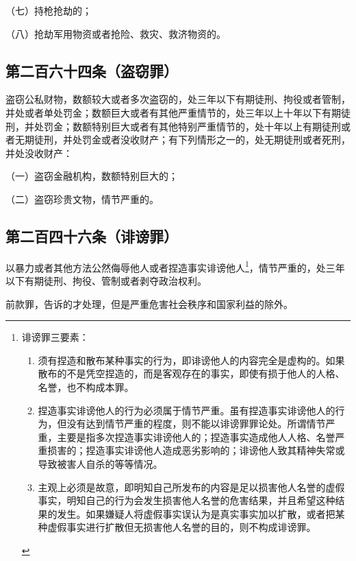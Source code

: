 \documentclass[utf-8,10pt]{ctexart}
\begin{document}
（七）持枪抢劫的；

（八）抢劫军用物资或者抢险、救灾、救济物资的。
\subsection{第二百六十四条（盗窃罪）}
盗窃公私财物，数额较大或者多次盗窃的，处三年以下有期徒刑、拘役或者管制，并处或者单处罚金；数额巨大或者有其他严重情节的，处三年以上十年以下有期徒刑，并处罚金；数额特别巨大或者有其他特别严重情节的，处十年以上有期徒刑或者无期徒刑，并处罚金或者没收财产；有下列情形之一的，处无期徒刑或者死刑，并处没收财产：

（一）盗窃金融机构，数额特别巨大的；

（二）盗窃珍贵文物，情节严重的。
\subsection{第二百四十六条（诽谤罪）}
以暴力或者其他方法公然侮辱他人或者捏造事实诽谤他人\footnote{
诽谤罪三要素：
\begin{enumerate}
\item 须有捏造和散布某种事实的行为，即诽谤他人的内容完全是虚构的。如果散布的不是凭空捏造的，而是客观存在的事实，即使有损于他人的人格、名誉，也不构成本罪。
\item 捏造事实诽谤他人的行为必须属于情节严重。虽有捏造事实诽谤他人的行为，但没有达到情节严重的程度，则不能以诽谤罪罪论处。所谓情节严重，主要是指多次捏造事实诽谤他人的；捏造事实造成他人人格、名誉严重损害的；捏造事实诽谤他人造成恶劣影响的；诽谤他人致其精神失常或导致被害人自杀的等等情况。
\item 主观上必须是故意，即明知自己所发布的内容是足以损害他人名誉的虚假事实，明知自己的行为会发生损害他人名誉的危害结果，并且希望这种结果的发生。如果嫌疑人将虚假事实误认为是真实事实加以扩散，或者把某种虚假事实进行扩散但无损害他人名誉的目的，则不构成诽谤罪。
\end{enumerate}
}，情节严重的，处三年以下有期徒刑、拘役、管制或者剥夺政治权利。

前款罪，告诉的才处理，但是严重危害社会秩序和国家利益的除外。
\end{document}
